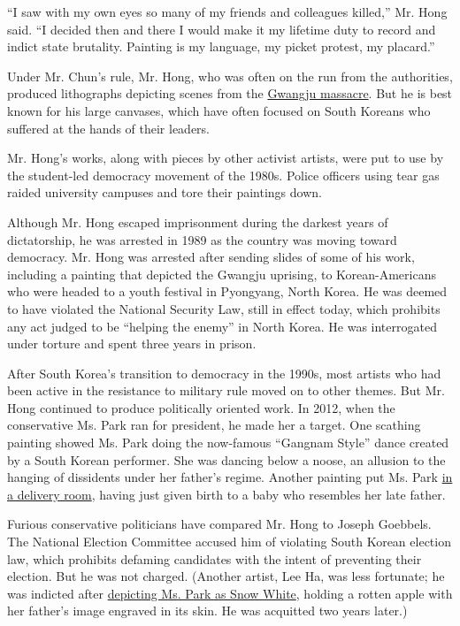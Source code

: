 ``I saw with my own eyes so many of my friends and colleagues killed,''
Mr. Hong said. ``I decided then and there I would make it my lifetime
duty to record and indict state brutality. Painting is my language, my
picket protest, my placard.''

Under Mr. Chun's rule, Mr. Hong, who was often on the run from the
authorities, produced lithographs depicting scenes from the
\href{http://www.nytimes3xbfgragh.onion/1996/08/29/world/the-people-of-kwangju-recall-1980-massacre.html}{Gwangju
massacre}. But he is best known for his large canvases, which have often
focused on South Koreans who suffered at the hands of their leaders.

Mr. Hong's works, along with pieces by other activist artists, were put
to use by the student-led democracy movement of the 1980s. Police
officers using tear gas raided university campuses and tore their
paintings down.

Although Mr. Hong escaped imprisonment during the darkest years of
dictatorship, he was arrested in 1989 as the country was moving toward
democracy. Mr. Hong was arrested after sending slides of some of his
work, including a painting that depicted the Gwangju uprising, to
Korean-Americans who were headed to a youth festival in Pyongyang, North
Korea. He was deemed to have violated the National Security Law, still
in effect today, which prohibits any act judged to be ``helping the
enemy'' in North Korea. He was interrogated under torture and spent
three years in prison.

After South Korea's transition to democracy in the 1990s, most artists
who had been active in the resistance to military rule moved on to other
themes. But Mr. Hong continued to produce politically oriented work. In
2012, when the conservative Ms. Park ran for president, he made her a
target. One scathing painting showed Ms. Park doing the now-famous
``Gangnam Style'' dance created by a South Korean performer. She was
dancing below a noose, an allusion to the hanging of dissidents under
her father's regime. Another painting put Ms. Park
\href{http://www.mediatoday.co.kr/news/articleView.html}{in a delivery
room}, having just given birth to a baby who resembles her late father.

Furious conservative politicians have compared Mr. Hong to Joseph
Goebbels. The National Election Committee accused him of violating South
Korean election law, which prohibits defaming candidates with the intent
of preventing their election. But he was not charged. (Another artist,
Lee Ha, was less fortunate; he was indicted after
\href{http://blogs.wsj.com/korearealtime/2013/05/30/pop-artist-challenges-censorship/}{depicting
Ms. Park as Snow White}, holding a rotten apple with her father's image
engraved in its skin. He was acquitted two years later.)

